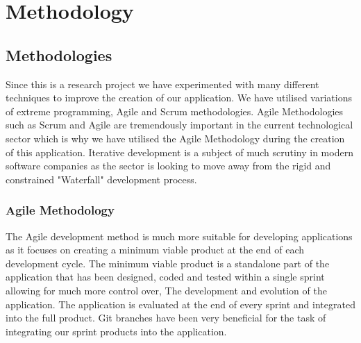 \begin{itemize}
\begin{enumerate}
\begin{itemize}
            \end{itemize}
        \end{enumerate}
    \end{itemize}


\chapter{Methodology}

\section{Methodologies}

  Since this is a research project we have experimented with many different techniques to improve the creation of our application. We have utilised variations of extreme programming,
  Agile and Scrum methodologies.
  Agile Methodologies such as Scrum and Agile are tremendously important in the current technological sector which is why we have utilised the Agile Methodology during the creation of this application\cite{agile}.
  Iterative development is a subject of much scrutiny in modern software companies as the sector is looking to move away from the rigid and constrained "Waterfall" development process\cite{agilewaterfall}.


  \subsection{Agile Methodology}
  The Agile development method is much more suitable for developing applications as it focuses on creating a minimum viable product at the end of each development cycle.
  The minimum viable product is a standalone part of the application that has been designed, coded and tested within a single sprint allowing for much more control over,
  The development and evolution of the application. The application is evaluated at the end of every sprint and integrated into the full product.
  Git branches have been very beneficial for the task of integrating our sprint products into the application.

